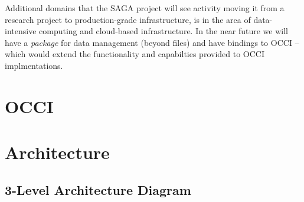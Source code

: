 \documentclass[10pt,conference,final,letterpaper,twoside,twocolumn,]{IEEEtran}
\begin{document}
 Additional domains that the SAGA project will see activity moving it
 from a research project to production-grade infrastructure, is in the
 area of data-intensive computing and cloud-based infrastructure. In
 the near future we will have a {\it package} for data management
 (beyond files) and have bindings to OCCI -- which would extend the
 functionality and capabilties provided to OCCI implmentations.

\section{OCCI}

\section{Architecture}

\subsection{3-Level Architecture Diagram}

% 
% 
\end{document}
